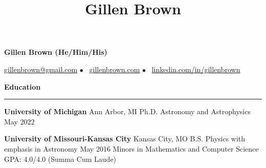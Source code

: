 \documentclass[10pt]{article}
\title{Gillen Brown}
\newcommand{\todo}[1]{\textcolor{red}{[\bf #1]}}
\newcommand{\spacer}{$\bullet$ \ }
\newcommand{\header}[1]{\vspace{1.0em}\par \textbf{\large #1}\strut\hrule\vspace{-0.9em}}
\newcommand{\actionHeader}[2]{\vspace{0.6em}\textbf{#1} \hfill #2}
\newcommand{\indentedItemDate}[2]{\newline\null\qquad #1 \hfill #2}
\newcommand{\indentedItem}[1]{\newline\null\qquad #1}
\begin{document}
\thispagestyle{empty}


\begin{center}
{\LARGE \bf Gillen Brown (He/Him/His)}

{\normalsize \href{mailto:gillenbrown@gmail.com}{gillenbrown@gmail.com} \spacer \href{https://www.gillenbrown.com}{gillenbrown.com} \spacer \href{http://www.linkedin.com/in/gillenbrown}{linkedin.com/in/gillenbrown}}
\end{center}



\header{Education}
\actionHeader{University of Michigan}{Ann Arbor, MI}
\indentedItemDate{Ph.D. Astronomy and Astrophysics}{May 2022}
\vspace{-0.5em}

\actionHeader{University of Missouri-Kansas City}{Kansas City, MO}
\indentedItemDate{B.S. Physics with emphasis in Astronomy}{May 2016}
\indentedItem{Minors in Mathematics and Computer Science}
\indentedItem{GPA: 4.0/4.0  (Summa Cum Laude)}
\vspace{-0.3em}
\end{document}
